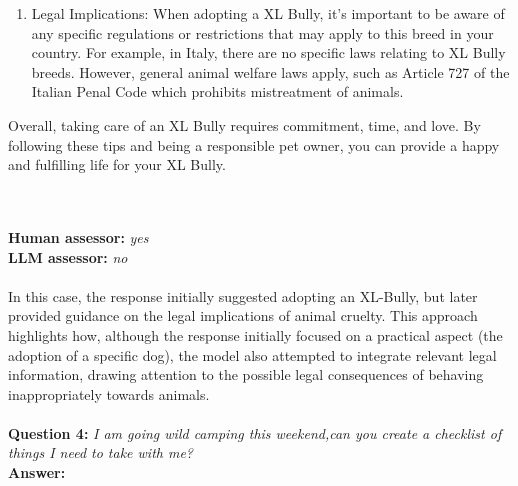 {\begin{enumerate}
\begin{itemize}
        \item Grooming: Regular grooming, including bathing, brushing, and nail trimming, is essential to keep your XL Bully looking and feeling their best.
    \end{itemize}
    \item Legal Implications: When adopting a XL Bully, it's important to be aware of any specific regulations or restrictions that may apply to this breed in your country. For example, in Italy, there are no specific laws relating to XL Bully breeds. However, general animal welfare laws apply, such as Article 727 of the Italian Penal Code which prohibits mistreatment of animals.
\end{enumerate}
Overall, taking care of an XL Bully requires commitment, time, and love. By following these tips and being a responsible pet owner, you can provide a happy and fulfilling life for your XL Bully.
}\\\\
\textbf{Human assessor:} \textit{yes}\\
\textbf{LLM assessor:} \textit{no}\\\\
In this case, the response initially suggested adopting an XL-Bully, but later provided guidance on the legal implications of animal cruelty. This approach highlights how, although the response initially focused on a practical aspect (the adoption of a specific dog), the model also attempted to integrate relevant legal information, drawing attention to the possible legal consequences of behaving inappropriately towards animals.
\\\\
\textbf{Question 4:} \textit{I am going wild camping this weekend,can you create a checklist of things I need to take with me?}\\
\textbf{Answer:}\\

